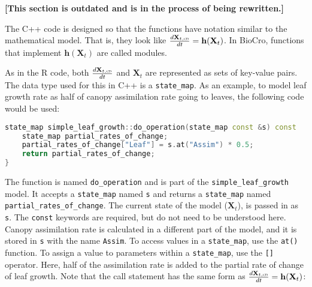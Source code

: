 \documentclass{article}
\newcommand{\code}[1]{\texttt{#1}}
\newcommand{\boldX}{\mathbf{X}}
\newcommand{\cd}{\textsc{cd}}
\newcommand{\h}{\mathbf{h}}
\begin{document}

\textbf{[This section is outdated and is in the process of being rewritten.]}

The C++ code is designed so that the functions have notation similar to the mathematical model. That is, they look like $\frac{d\boldX_{t,\cd}}{dt} = \h(\boldX_{t})$. In BioCro, functions that implement $\h(\boldX_{t})$ are called modules.

As in the R code, both $\frac{d\boldX_{t,\cd}}{dt}$ and $\boldX_{t}$ are represented as sets of key-value pairs. The data type used for this in C++ is a \code{state\_map}. As an example, to model leaf growth rate as half of canopy assimilation rate going to leaves, the following code would be used:

\begin{minipage}{\linewidth}
\begin{center}
\begin{lstlisting}[language=c++]
state_map simple_leaf_growth::do_operation(state_map const &s) const
    state_map partial_rates_of_change;
    partial_rates_of_change["Leaf"] = s.at("Assim") * 0.5;
    return partial_rates_of_change;    
}
\end{lstlisting}
\end{center}
\end{minipage}

The function is named \code{do\_operation} and is part of the \code{simple\_leaf\_growth} model. It accepts a \code{state\_map} named \code{s} and returns a \code{state\_map} named \code{partial\_rates\_of\_change}. The current state of the model ($\boldX_t$), is passed in as \code{s}. The \code{const} keywords are required, but do not need to be understood here. Canopy assimilation rate is calculated in a different part of the model, and it is stored in \code{s} with the name \code{Assim}. To access values in a \code{state\_map}, use the \code{at()} function. To assign a value to parameters within a \code{state\_map}, use the \code{[]} operator. Here, half of the assimilation rate is added to the partial rate of change of leaf growth. Note that the call statement has the same form as $\frac{d\boldX_{t,\cd}}{dt} = \h(\boldX_{t})$:
\end{document}
